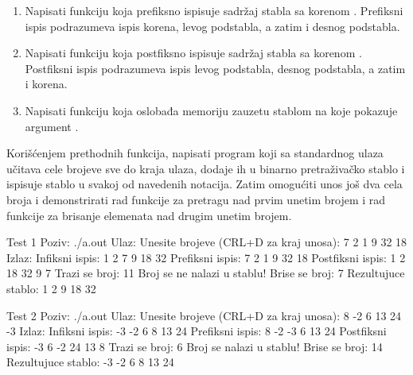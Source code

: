 \begin{Exercise}[label=701]
\begin{enumerate}
\item Napisati funkciju  koja prefiksno ispisuje sadržaj stabla sa korenom . Prefiksni ispis podrazumeva ispis korena, levog podstabla, a zatim i desnog podstabla.

\item Napisati funkciju  koja postfiksno ispisuje sadržaj stabla sa korenom . Postfiksni ispis podrazumeva ispis levog podstabla, desnog podstabla, a zatim i korena.

\item Napisati funkciju  koja oslobađa memoriju zauzetu stablom na koje pokazuje argument .
\end{enumerate}

Korišćenjem prethodnih funkcija, napisati program koji sa standardnog ulaza učitava cele brojeve sve do kraja ulaza, dodaje ih u binarno pretraživačko stablo i ispisuje stablo u svakoj od navedenih notacija. Zatim omogućiti unos još dva cela broja i demonstrirati rad funkcije za pretragu nad prvim unetim brojem i rad funkcije za brisanje elemenata nad drugim unetim brojem. 

\begin{maxitest}
\begin{test}{Test 1}
Poziv: ./a.out
Ulaz:
	Unesite brojeve (CRL+D za kraj unosa): 7 2 1 9 32 18
Izlaz:
	Infiksni ispis: 1 2 7 9 18 32
	Prefiksni ispis: 7 2 1 9 32 18
	Postfiksni ispis: 1 2 18 32 9 7
	Trazi se broj: 11
	Broj se ne nalazi u stablu!
	Brise se broj: 7
	Rezultujuce stablo: 1 2 9 18 32
\end{test}
\end{maxitest}

\begin{maxitest}
\begin{test}{Test 2}
Poziv: ./a.out
Ulaz:
	Unesite brojeve (CRL+D za kraj unosa): 8 -2 6 13 24 -3
Izlaz:
	Infiksni ispis:  -3 -2 6 8 13 24
	Prefiksni ispis: 8 -2 -3 6 13 24
	Postfiksni ispis: -3 6 -2 24 13 8 
	Trazi se broj: 6
	Broj se nalazi u stablu!
	Brise se broj: 14
	Rezultujuce stablo: -3 -2 6 8 13 24
\end{test}
\end{maxitest}
\end{Exercise}

\begin{Answer}[ref=701]
\end{Answer}



